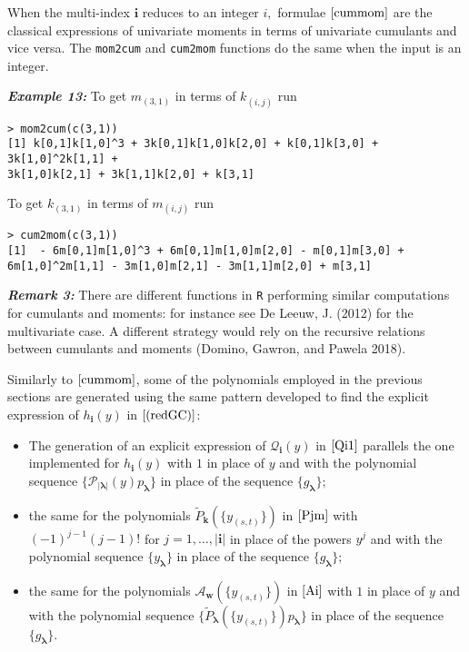When the multi-index \(\boldsymbol{i}\) reduces to an integer \(i,\) formulae \(\eqref{cummom}\) are the classical expressions of univariate moments in terms of univariate cumulants and vice versa. The \texttt{mom2cum} and \texttt{cum2mom} functions do the same when the input is an integer.

\hskip-0.5cm\textbf{\emph{Example 13:}} To get \(m_{(3,1)}\) in terms of \(k_{(i,j)}\)
run

\begin{verbatim}
> mom2cum(c(3,1))
[1] k[0,1]k[1,0]^3 + 3k[0,1]k[1,0]k[2,0] + k[0,1]k[3,0] + 3k[1,0]^2k[1,1] +
3k[1,0]k[2,1] + 3k[1,1]k[2,0] + k[3,1]
\end{verbatim}

\noindent To get \(k_{(3,1)}\) in terms of \(m_{(i,j)}\) run

\begin{verbatim}
> cum2mom(c(3,1))
[1]  - 6m[0,1]m[1,0]^3 + 6m[0,1]m[1,0]m[2,0] - m[0,1]m[3,0] + 
6m[1,0]^2m[1,1] - 3m[1,0]m[2,1] - 3m[1,1]m[2,0] + m[3,1]
\end{verbatim}

\hskip-0.5cm\textbf{\emph{Remark 3:}} There are different functions in \texttt{R}
performing similar computations for cumulants and moments: for instance see De Leeuw, J. (2012) for the multivariate case. A different strategy would rely on the recursive relations between cumulants and moments (Domino, Gawron, and Pawela 2018).

Similarly to \(\eqref{cummom}\), some of the polynomials employed in the previous sections are generated using the same pattern developed to find the explicit expression of \(h_{\boldsymbol{i}}(y)\) in \(\eqref{(redGC)}\):

\begin{itemize}
\item
  The generation of an explicit expression of \({\mathcal Q}_{\boldsymbol{i}}(y)\) in \(\eqref{Qi1}\) parallels the one implemented for \(h_{\boldsymbol{i}}(y)\) with \(1\) in place of \(y\) and with the polynomial sequence \(\{{\mathcal P}_{|\boldsymbol{\lambda}|}(y) p_{\boldsymbol{\lambda}}\}\) in place of the sequence \(\{g_{\boldsymbol{\lambda}}\};\)
\item
  the same for the polynomials \(\tilde{P}_{\boldsymbol{k}}\left( \{y_{(s,t)}\} \right)\) in \(\eqref{Pjm}\) with \((-1)^{j-1} (j-1)!\) for \(j=1,\ldots,|\boldsymbol{i}|\) in place of the powers \(y^j\) and with the polynomial sequence \(\{y_{\boldsymbol{\lambda}}\}\) in place of the sequence \(\{g_{\boldsymbol{\lambda}}\};\)
\item
  the same for the polynomials \({\mathcal A}_{\boldsymbol{w}} \left( \{y_{(s,t)}\} \right)\) in \(\eqref{Ai}\) with \(1\) in place of \(y\) and with the polynomial sequence \(\bigg\{\tilde{P}_{\boldsymbol{\lambda}}\left( \{y_{(s,t)}\} \right)p_{\boldsymbol{\lambda}}\bigg\}\) in place of the sequence \(\{g_{\boldsymbol{\lambda}}\}.\)
\end{itemize}

